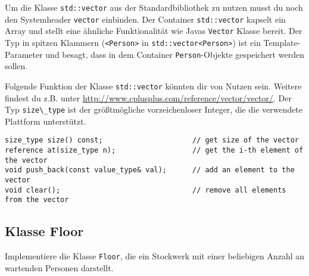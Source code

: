 Um die Klasse \lstinline{std::vector} aus der Standardbibliothek zu nutzen musst du noch den Systemheader \lstinline{vector} einbinden.
Der Container \lstinline{std::vector} kapselt ein Array und stellt eine ähnliche Funktionalität wie Javas \lstinline{Vector} Klasse bereit.
Der Typ in spitzen Klammern (\lstinline{<Person>} in \lstinline{std::vector<Person>}) ist ein Template-Parameter und besagt, dass in dem Container \lstinline{Person}-Objekte gespeichert werden sollen.

Folgende Funktion der Klasse \lstinline{std::vector} könnten dir von Nutzen sein. Weitere findest du z.B. unter \url{http://www.cplusplus.com/reference/vector/vector/}. Der Typ \lstinline{size\_type} ist der größtmögliche vorzeichenloser Integer, die die verwendete Plattform unterstützt.

\begin{lstlisting}
size_type size() const;                     // get size of the vector
reference at(size_type n);                  // get the i-th element of the vector
void push_back(const value_type& val);      // add an element to the vector
void clear();                               // remove all elements from the vector
\end{lstlisting}


\subsection{Klasse Floor}
Implementiere die Klasse \lstinline{Floor}, die ein Stockwerk mit einer beliebigen Anzahl an wartenden Personen darstellt.

